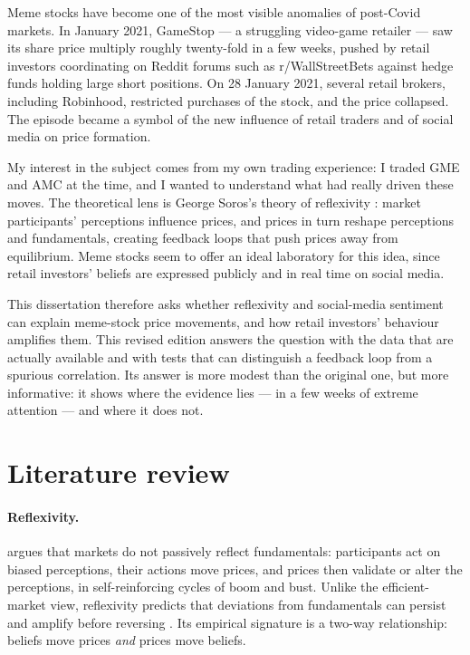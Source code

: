 \documentclass[11pt,a4paper]{article}
\begin{document}
Meme stocks have become one of the most visible anomalies of post-Covid markets.
In January 2021, GameStop --- a struggling video-game retailer --- saw its share
price multiply roughly twenty-fold in a few weeks, pushed by retail investors
coordinating on Reddit forums such as r/WallStreetBets against hedge funds holding
large short positions. On 28 January 2021, several retail brokers, including
Robinhood, restricted purchases of the stock, and the price collapsed. The episode
became a symbol of the new influence of retail traders and of social media on
price formation.

My interest in the subject comes from my own trading experience: I traded GME and
AMC at the time, and I wanted to understand what had really driven these moves.
The theoretical lens is George Soros's theory of reflexivity
\citep{soros1987,soros1998}: market participants' perceptions influence prices,
and prices in turn reshape perceptions and fundamentals, creating feedback loops
that push prices away from equilibrium. Meme stocks seem to offer an ideal
laboratory for this idea, since retail investors' beliefs are expressed publicly
and in real time on social media.

This dissertation therefore asks whether reflexivity and social-media sentiment
can explain meme-stock price movements, and how retail investors' behaviour
amplifies them. This revised edition answers the question with the data that are
actually available and with tests that can distinguish a feedback loop from a
spurious correlation. Its answer is more modest than the original one, but more
informative: it shows where the evidence lies --- in a few weeks of extreme
attention --- and where it does not.

\section{Literature review}

\paragraph{Reflexivity.} \citet{soros1987} argues that markets do not passively
reflect fundamentals: participants act on biased perceptions, their actions move
prices, and prices then validate or alter the perceptions, in self-reinforcing
cycles of boom and bust. Unlike the efficient-market view, reflexivity predicts
that deviations from fundamentals can persist and amplify before reversing
\citep{soros1998}. Its empirical signature is a two-way relationship: beliefs
move prices \emph{and} prices move beliefs.
\end{document}

